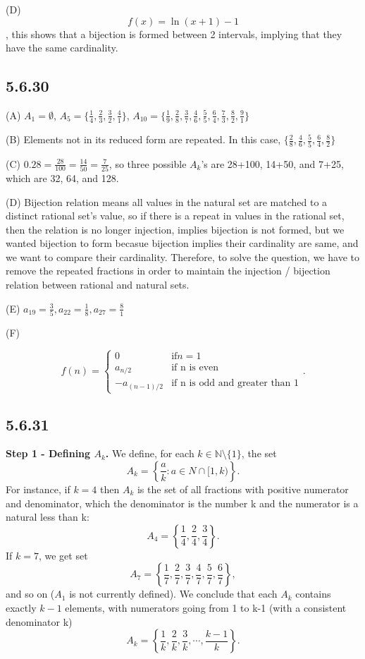 \documentclass{article}
\begin{document}
(D) $$f\left(x\right)=\ln\left(x+1\right)-1$$, this shows that a bijection is formed between 2 intervals, implying that they have the same cardinality.

\subsection*{5.6.30}

(A) $A_1=\emptyset$, $A_5=\{\frac{1}{4}, \frac{2}{3}, \frac{3}{2}, \frac{4}{1}\}$, $A_{10}=\{\frac{1}{9},\frac{2}{8},\frac{3}{7},\frac{4}{6},\frac{5}{5},\frac{6}{4},\frac{7}{3},\frac{8}{2},\frac{9}{1}\}$

(B) Elements not in its reduced form are repeated. In this case, $\{\frac{2}{8},\frac{4}{6},\frac{5}{5},\frac{6}{4},\frac{8}{2}\}$

(C) $0.28=\frac{28}{100}=\frac{14}{50}=\frac{7}{25}$, so three possible $A_k$'s are 28+100, 14+50, and 7+25, which are 32, 64, and 128.

(D) Bijection relation means all values in the natural set are matched to a distinct rational set's value, so if there is a repeat in values in the rational set, then the relation is no longer injection, implies bijection is not formed, but we wanted bijection to form becasue bijection implies their cardinality are same, and we want to compare their cardinality. Therefore, to solve the question, we have to remove the repeated fractions in order to maintain the injection / bijection relation between rational and natural sets.

(E) $a_{19}=\frac{3}{5}, a_{22}=\frac{1}{8}, a_{27}=\frac{8}{1}$

(F) 

$$f(n)=\begin{cases}
    0 \quad &\text{if}n=1\\
    a_{n/2} &\text{if n is even}\\
    -a_{(n-1)/2} &\text{if n is odd and greater than 1}
\end{cases}.$$

\subsection*{5.6.31}

\textbf{Step 1 - Defining $A_k$.} We define, for each $k\in\mathbb{N}\setminus\{1\}$, the set $$A_{k}=\left\{\frac{a}{k}:a\in N\cap[1,k)\right\}.$$ For instance, if $k=4$ then $A_k$ is the set of all fractions with positive numerator and denominator, which the denominator is the number k and the numerator is a natural less than k: $$A_4=\left\{\frac{1}{4},\frac{2}{4},\frac{3}{4}\right\}.$$ If $k=7$, we get set $$A_7=\left\{\frac{1}{7},\frac{2}{7},\frac{3}{7},\frac{4}{7},\frac{5}{7},\frac{6}{7}\right\},$$ and so on ($A_1$ is not currently defined). We conclude that each $A_k$ contains exactly $k-1$ elements, with numerators going from 1  to k-1 (with a consistent denominator k) $$A_k=\left\{\frac{1}{k},\frac{2}{k},\frac{3}{k},\cdots,\frac{k-1}{k}\right\}.$$
\end{document}
